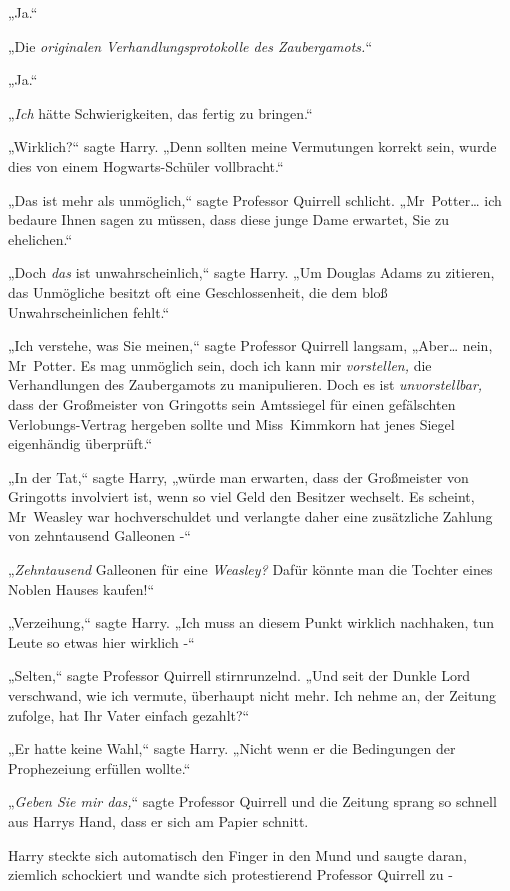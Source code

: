 {„Ja.“

„Die \emph{originalen Verhandlungsprotokolle des Zaubergamots.}“

„Ja.“

„\emph{Ich} hätte Schwierigkeiten, das fertig zu bringen.“

„Wirklich?“ sagte Harry. „Denn sollten meine Vermutungen korrekt sein, wurde dies von einem Hogwarts-Schüler vollbracht.“

„Das ist mehr als unmöglich,“ sagte Professor Quirrell schlicht. „Mr~Potter… ich bedaure Ihnen sagen zu müssen, dass diese junge Dame erwartet, Sie zu ehelichen.“

„Doch \emph{das} ist unwahrscheinlich,“ sagte Harry. „Um Douglas Adams zu zitieren, das Unmögliche besitzt oft eine Geschlossenheit, die dem bloß Unwahrscheinlichen fehlt.“

„Ich verstehe, was Sie meinen,“ sagte Professor Quirrell langsam, „Aber… nein, Mr~Potter. Es mag unmöglich sein, doch ich kann mir \emph{vorstellen,} die Verhandlungen des Zaubergamots zu manipulieren. Doch es ist \emph{unvorstellbar,} dass der Großmeister von Gringotts sein Amtssiegel für einen gefälschten Verlobungs-Vertrag hergeben sollte und Miss~Kimmkorn hat jenes Siegel eigenhändig überprüft.“

„In der Tat,“ sagte Harry, „würde man erwarten, dass der Großmeister von Gringotts involviert ist, wenn so viel Geld den Besitzer wechselt. Es scheint, Mr~Weasley war hochverschuldet und verlangte daher eine zusätzliche Zahlung von zehntausend Galleonen -“

„\emph{Zehntausend} Galleonen für eine \emph{Weasley?} Dafür könnte man die Tochter eines Noblen Hauses kaufen!“

„Verzeihung,“ sagte Harry. „Ich muss an diesem Punkt wirklich nachhaken, tun Leute so etwas hier wirklich -“

„Selten,“ sagte Professor Quirrell stirnrunzelnd. „Und seit der Dunkle Lord verschwand, wie ich vermute, überhaupt nicht mehr. Ich nehme an, der Zeitung zufolge, hat Ihr Vater einfach gezahlt?“

„Er hatte keine Wahl,“ sagte Harry. „Nicht wenn er die Bedingungen der Prophezeiung erfüllen wollte.“

„\emph{Geben Sie mir das,}“ sagte Professor Quirrell und die Zeitung sprang so schnell aus Harrys Hand, dass er sich am Papier schnitt.

Harry steckte sich automatisch den Finger in den Mund und saugte daran, ziemlich schockiert und wandte sich protestierend Professor Quirrell zu -

}
